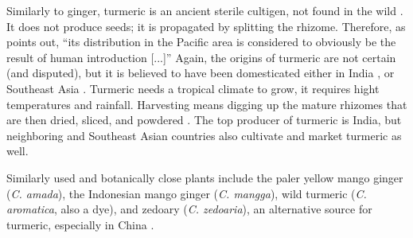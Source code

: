 Similarly to ginger, turmeric is an ancient sterile \gls{cultigen}, not found in the wild \autocite[128]{van_wyk_culinary_2014}. It does not produce seeds; it is propagated by splitting the rhizome. Therefore, as \textcite{kikusawa_proto_2007} points out, ``its distribution in the Pacific area is considered to obviously be the result of human introduction [...]'' Again, the origins of turmeric are not certain (and disputed), but it is believed to have been domesticated either in India \autocite{van_wyk_culinary_2014,powo,nair_turmeric_2019}, or Southeast Asia \autocite{mabberley_mabberleys_2017,kikusawa_proto_2007}. Turmeric needs a tropical climate to grow, it requires hight temperatures and rainfall. Harvesting means digging up the mature rhizomes that are then dried, sliced, and powdered \autocite[128]{van_wyk_culinary_2014}. The top producer of turmeric is India, but neighboring and Southeast Asian countries also cultivate and market turmeric as well.

Similarly used and botanically close plants include the paler yellow mango ginger (\textit{C. amada}), the Indonesian mango ginger (\textit{C. mangga}), wild turmeric (\textit{C. aromatica}, also a dye), and zedoary (\textit{C. zedoaria}), an alternative source for turmeric, especially in China \autocite[128]{van_wyk_culinary_2014}.





